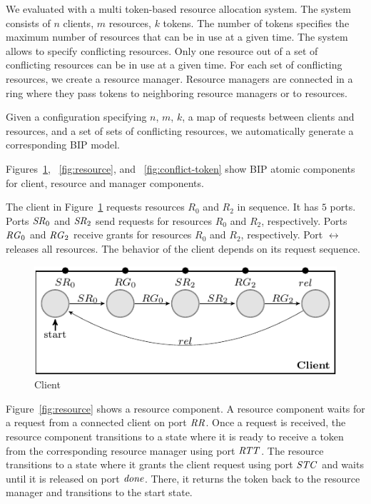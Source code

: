 We evaluated \deadlocktool{} with a multi token-based resource allocation system. 
The system consists of $n$ clients, $m$ resources, $k$ tokens. 
The number of tokens specifies the maximum number of resources that
can be in use at a given time. 
The system allows to specify conflicting resources. 
Only one resource out of a set of conflicting resources can be in use at a given time.
For each set of conflicting resources, we create a resource manager.
Resource managers are connected in a ring where they pass tokens to neighboring resource managers or to resources. 

Given a configuration specifying $n$, $m$, $k$, a map of requests between clients and resources, and a set of sets of conflicting resources, 
we automatically generate a corresponding BIP model.

Figures~\ref{fig:client},
~\ref{fig:resource}, and
~\ref{fig:conflict-token}
show BIP atomic components for client, resource and manager components. 

The client in Figure~\ref{fig:client} requests resources $R_0$ and $R_2$ in sequence. It has $5$ ports. 
Ports $\mathit{SR}_0$ and $\mathit{SR}_2$ send requests for 
resources $R_0$ and $R_2$, respectively.
Ports $\mathit{RG}_0$ and $\mathit{RG}_2$ receive grants for 
resources $R_0$ and $R_2$, respectively.
Port $\rel$ releases all resources. 
The behavior of the client depends on its request sequence. 

\begin{figure}[H]
\begin{center}
\includegraphics[scale=1.2]{compiledfigures/client-crop.pdf}
\caption{Client}
\label{fig:client}
\end{center}
\end{figure}

Figure~\ref{fig:resource} shows a resource component. 
A resource component waits for a request from a connected client on port $\mathit{RR}$. 
Once a request is received, the resource component transitions to a state where it is ready to 
receive a token from the corresponding resource manager using port $\mathit{RTT}$.
The resource transitions to a state where it grants the client request using port $\mathit{STC}$ and waits until it is released on port $\mathit{done}$. 
There, it returns the token back to the resource manager and transitions to the start state. 

